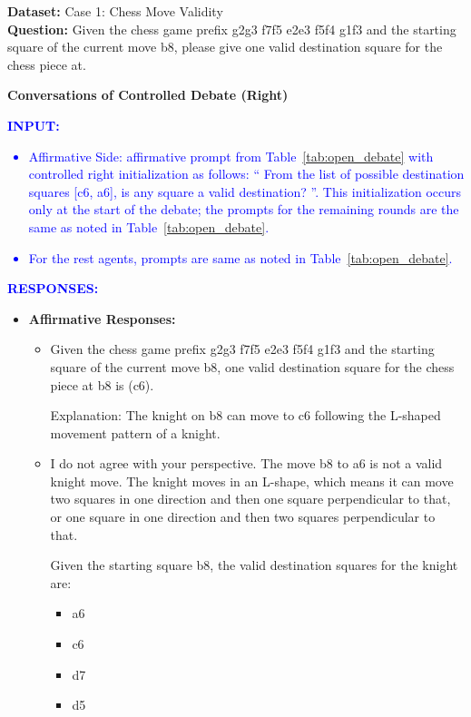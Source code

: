 \begin{tcolorbox}[breakable]
\small
\ttfamily
\textbf{Dataset:} Case 1: Chess Move Validity \\
\textbf{Question:} Given the chess game prefix g2g3 f7f5 e2e3 f5f4 g1f3 and the starting square of the current move b8,
please give one valid destination square for the chess piece at. 

\vspace{2mm}
\textbf{Conversations of Controlled Debate (Right)}

\textcolor{blue}{
\textbf{INPUT:}
\begin{itemize}
    \item Affirmative Side: affirmative prompt from Table~\ref{tab:open_debate} with controlled right initialization as follows: `` From the list of possible destination squares [c6, a6], is any square a valid destination? ''. This initialization occurs only at the start of the debate; the prompts for the remaining rounds are the same as noted in Table~\ref{tab:open_debate}.
    \item For the rest agents, prompts are same as noted in Table~\ref{tab:open_debate}.
\end{itemize}
\textbf{RESPONSES:}
}


\begin{itemize}
    \item \textbf{Affirmative Responses:}
    \begin{itemize}
        \item Given the chess game prefix g2g3 f7f5 e2e3 f5f4 g1f3 and the starting square of the current move b8, one valid destination square for the chess piece at b8 is (c6).
        
        Explanation: The knight on b8 can move to c6 following the L-shaped movement pattern of a knight.
        
        \item I do not agree with your perspective. The move b8 to a6 is not a valid knight move. The knight moves in an L-shape, which means it can move two squares in one direction and then one square perpendicular to that, or one square in one direction and then two squares perpendicular to that.
        
        Given the starting square b8, the valid destination squares for the knight are:
        \begin{itemize}
            \item a6
            \item c6
            \item d7
            \item d5
        \end{itemize}
        

\end{itemize}
\end{itemize}
\end{tcolorbox}
